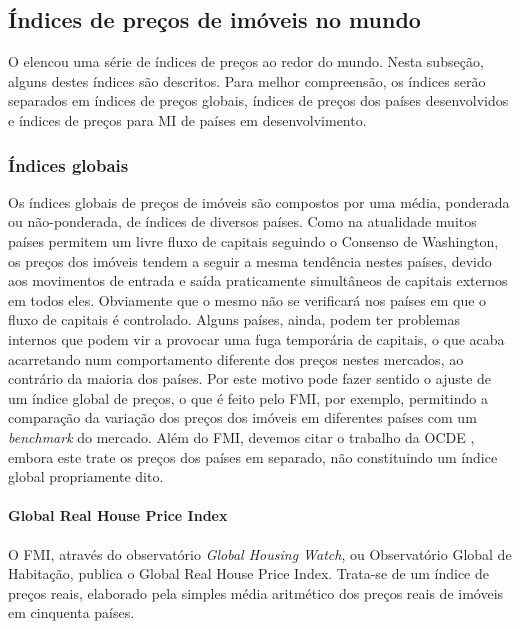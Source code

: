 \documentclass[
	12pt,				%
	oneside,			%
	a4paper,			%
	chapter=TITLE,		%
	section=TITLE,		%
	english,			%
	brazil				%
	]{abntex2}
\begin{document}
\begin{refsection}
\hypertarget{uxedndices-de-preuxe7os-de-imuxf3veis-no-mundo}{%
\subsection{Índices de preços de imóveis no mundo}\label{uxedndices-de-preuxe7os-de-imuxf3veis-no-mundo}}

O \textcite{rppi} elencou uma série de índices de preços ao redor do mundo. Nesta
subseção, alguns destes índices são descritos. Para melhor compreensão, os
índices serão separados em índices de preços globais, índices de preços dos
países desenvolvidos e índices de preços para \gls{MI} de países em
desenvolvimento.

\hypertarget{uxedndices-globais}{%
\subsubsection{Índices globais}\label{uxedndices-globais}}

Os índices globais de preços de imóveis são compostos por uma média, ponderada
ou não-ponderada, de índices de diversos países. Como na atualidade muitos
países permitem um livre fluxo de capitais seguindo o Consenso de Washington, os
preços dos imóveis tendem a seguir a mesma tendência nestes países, devido aos
movimentos de entrada e saída praticamente simultâneos de capitais externos em
todos eles. Obviamente que o mesmo não se verificará nos países em que o fluxo
de capitais é controlado. Alguns países, ainda, podem ter problemas internos que
podem vir a provocar uma fuga temporária de capitais, o que acaba acarretando
num comportamento diferente dos preços nestes mercados, ao contrário da maioria
dos países. Por este motivo pode fazer sentido o ajuste de um índice global de
preços, o que é feito pelo \gls{FMI}, por exemplo, permitindo a comparação da
variação dos preços dos imóveis em diferentes países com um \emph{benchmark} do
mercado. Além do FMI, devemos citar o trabalho da \gls{OCDE} \autocite{oecd}, embora
este trate os preços dos países em separado, não constituindo um índice global
propriamente dito.

\hypertarget{global-real-house-price-index}{%
\paragraph{Global Real House Price Index}\label{global-real-house-price-index}}

O FMI, através do observatório \emph{Global Housing Watch}, ou Observatório Global de
Habitação, publica o Global Real House Price Index. Trata-se de um índice de
preços reais, elaborado pela simples média aritmético dos preços reais de
imóveis em cinquenta países.


\end{refsection}
\end{document}
